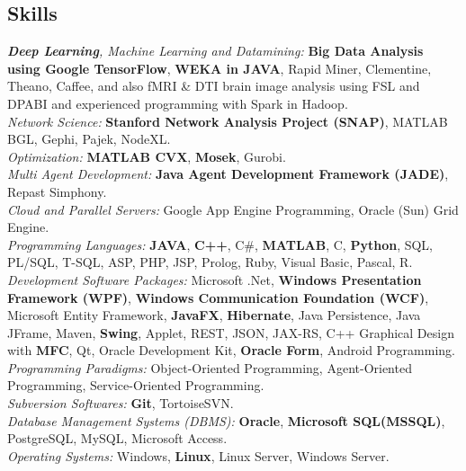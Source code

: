 \documentclass[letter]{res}
\begin{document}
\begin{resume}
		\section{Skills}
		{\sl \textbf{Deep Learning}, Machine Learning and Datamining: }\textbf{Big Data Analysis using Google TensorFlow}, \textbf{WEKA in JAVA}, Rapid Miner, Clementine, Theano, Caffee, and also fMRI \& DTI brain image analysis using FSL and DPABI and experienced programming with Spark in Hadoop.\\
		{\sl Network Science: }\textbf{Stanford Network Analysis Project (SNAP)}, MATLAB BGL, Gephi, Pajek, NodeXL.\\
		{\sl Optimization: }\textbf{MATLAB CVX}, \textbf{Mosek}, Gurobi.\\
		{\sl Multi Agent Development: }\textbf{Java Agent Development Framework (JADE)}, Repast Simphony.\\
		{\sl Cloud and Parallel Servers: }Google App Engine Programming, Oracle (Sun) Grid Engine.\\
		\textit{Programming Languages: }\textbf{JAVA}, \textbf{C++}, C\#, \textbf{MATLAB}, C, \textbf{Python}, SQL, PL/SQL, T-SQL, ASP, PHP, JSP, Prolog, Ruby, Visual Basic, Pascal, R.\\
		\textit{Development Software Packages: }Microsoft .Net, \textbf{Windows Presentation Framework (WPF)}, \textbf{Windows Communication Foundation (WCF)}, Microsoft Entity Framework, \textbf{JavaFX}, \textbf{Hibernate}, Java Persistence, Java JFrame, Maven, \textbf{Swing}, Applet, REST, JSON, JAX-RS, C++ Graphical Design with \textbf{MFC}, Qt, Oracle Development Kit, \textbf{Oracle Form}, Android Programming.\\
		\textit{Programming Paradigms: }Object-Oriented Programming, Agent-Oriented Programming, Service-Oriented Programming.\\
		\textit{Subversion Softwares: }\textbf{Git}, TortoiseSVN.\\
		\textit{Database Management Systems (DBMS): }\textbf{Oracle}, \textbf{Microsoft SQL(MSSQL)}, PostgreSQL, MySQL, Microsoft Access.\\
		\textit{Operating Systems: }Windows, \textbf{Linux}, Linux Server, Windows Server.
		

\end{resume}
\end{document}

